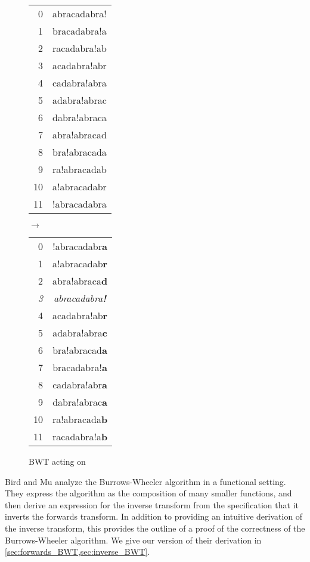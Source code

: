 \documentclass[11pt]{thesis}
\begin{document}
\begin{figure}[!hb]
  \centering
  \begin{tt}
  \begin{tabular}{rc}
    0  & abracadabra! \\
    1  & bracadabra!a \\
    2  & racadabra!ab \\
    3  & acadabra!abr \\
    4  & cadabra!abra \\
    5  & adabra!abrac \\
    6  & dabra!abraca \\
    7  & abra!abracad \\
    8  & bra!abracada \\
    9  & ra!abracadab \\
    10 & a!abracadabr \\
    11 & !abracadabra
  \end{tabular}
  $\rightarrow$
  \begin{tabular}{rc}
    0  & !abracadabr\textbf{a} \\
    1  & a!abracadab\textbf{r} \\
    2  & abra!abraca\textbf{d} \\
    \textit{3} & \textit{abracadabra\textbf{!}} \\
    4  & acadabra!ab\textbf{r} \\
    5  & adabra!abra\textbf{c} \\
    6  & bra!abracad\textbf{a} \\
    7  & bracadabra!\textbf{a} \\
    8  & cadabra!abr\textbf{a} \\
    9  & dabra!abrac\textbf{a} \\
    10 & ra!abracada\textbf{b} \\
    11 & racadabra!a\textbf{b}
  \end{tabular}
  \end{tt}
  \caption{BWT acting on }
  \label{fig:bw_ex}
\end{figure}

Bird and Mu \cite{birdmu,pearls} analyze the Burrows-Wheeler algorithm
in a functional setting. They express the algorithm as the composition
of many smaller functions, and then derive an expression for the
inverse transform from the specification that it inverts the forwards
transform. In addition to providing an intuitive derivation of the
inverse transform, this provides the outline of a proof of the
correctness of the Burrows-Wheeler algorithm. We give our version of
their derivation in \cref{sec:forwards_BWT,sec:inverse_BWT}.
\end{document}
